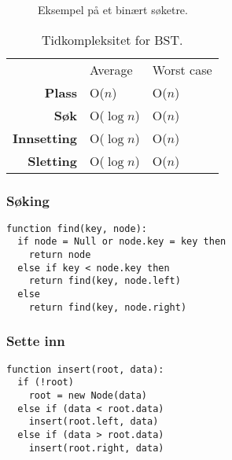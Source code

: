 \documentclass[11pt,a4paper]{article}
\theoremstyle{def}
\begin{document}
\begin{figure}[h!]
\centering
{}
\label{fig:simplebst}
\caption{Eksempel på et binært søketre.}
\end{figure}

\begin{table}[h!]
\centering
\begin{tabular}{rll}
&Average&Worst case\\
\textbf{Plass} & O($n$) & O($n$)\\
\textbf{Søk} & O($\log n$) & O($n$)\\
\textbf{Innsetting} & O($\log n$) & O($n$)\\
\textbf{Sletting} & O($\log n$) & O($n$)\\
\end{tabular}
\label{tab:obst}
\caption{Tidkompleksitet for BST.}
\end{table}

\subsubsection{Søking}
\begin{lstlisting}
function find(key, node):
  if node = Null or node.key = key then
    return node
  else if key < node.key then
    return find(key, node.left)
  else
    return find(key, node.right)
\end{lstlisting}

\vspace{-25pt}

\subsubsection{Sette inn}
\begin{lstlisting}
function insert(root, data):
  if (!root)
    root = new Node(data)
  else if (data < root.data)
    insert(root.left, data)
  else if (data > root.data)
    insert(root.right, data)
\end{lstlisting}
\end{document}
